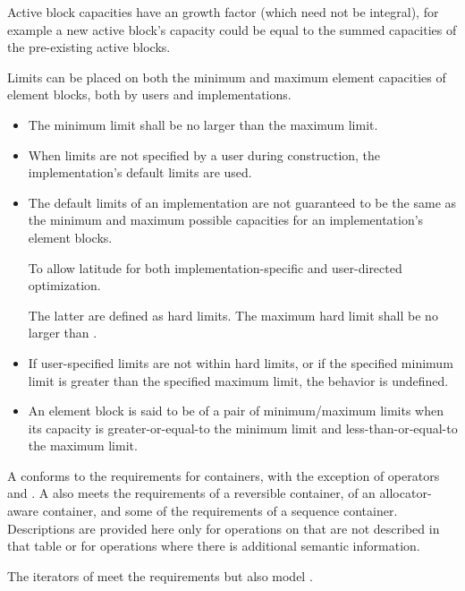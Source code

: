 \pnum
Active block capacities have
an  growth factor
(which need not be integral),
for example a new active block's capacity could be equal to
the summed capacities of the pre-existing active blocks.

\pnum
Limits can be placed on
both the minimum and maximum element capacities of element blocks,
both by users and implementations.
\begin{itemize}
\item
The minimum limit shall be no larger than the maximum limit.
\item
When limits are not specified by a user during construction,
the implementation's default limits are used.
\item
The default limits of an implementation are not guaranteed to be the same as
the minimum and maximum possible capacities
for an implementation's element blocks.
\begin{note}
To allow latitude for
both implementation-specific and user-directed optimization.
\end{note}
The latter are defined as hard limits.
The maximum hard limit shall be no larger than
.
\item
If user-specified limits are not within hard limits, or
if the specified minimum limit is greater than the specified maximum limit,
the behavior is undefined.
\item
An element block is said to be 
of a pair of minimum/maximum limits
when its capacity is greater-or-equal-to the minimum limit and
less-than-or-equal-to the maximum limit.
\end{itemize}

\pnum
A  conforms to
the requirements for containers,
with the exception of operators \tcode{==} and \tcode{!=}.
A  also meets the requirements
of a reversible container,
of an allocator-aware container, and
some of the requirements of a sequence container.
Descriptions are provided here only for operations on 
that are not described in that table or for operations
where there is additional semantic information.

\pnum
The iterators of  meet
the  requirements
but also model .

